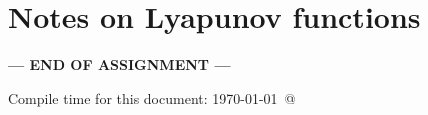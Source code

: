 \documentclass[12pt]{article}
\begin{document}
\newpage
\section*{Notes on Lyapunov functions}\hypertarget{NotesLyapFuns}{}

\NotesOnLyapunovFunctions




\bigskip

\centerline{\bf--- END OF ASSIGNMENT ---}

\bigskip
Compile time for this document:
\today\ @ \thistime
\end{document}
